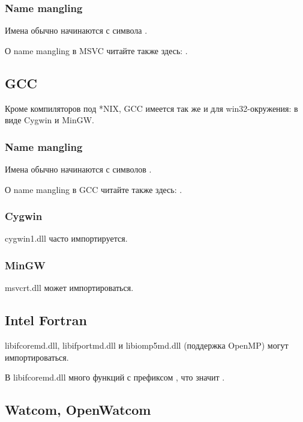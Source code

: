 \subsubsection{Name mangling}

Имена обычно начинаются с символа .

О \gls{name mangling} в MSVC читайте также здесь: .

\subsection{GCC}

Кроме компиляторов под *NIX, GCC имеется так же и для win32-окружения: в виде Cygwin и MinGW.

\subsubsection{Name mangling}

Имена обычно начинаются с символов .

О \gls{name mangling} в GCC читайте также здесь: .

\subsubsection{Cygwin}

cygwin1.dll часто импортируется.

\subsubsection{MinGW}

msvcrt.dll может импортироваться.

\subsection{Intel Fortran}

libifcoremd.dll, libifportmd.dll и libiomp5md.dll (поддержка OpenMP) могут импортироваться.

В libifcoremd.dll много функций с префиксом , что значит .

\subsection{Watcom, OpenWatcom}

